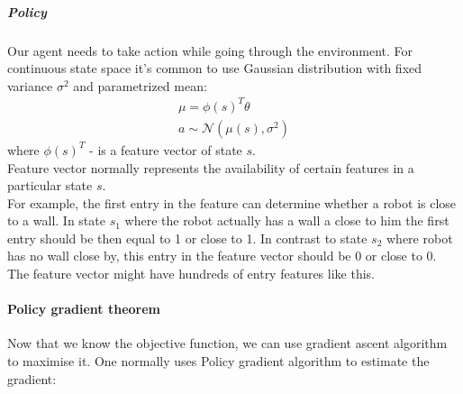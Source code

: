 \subparagraph{Policy} Our agent needs to take action while going through
the environment.
For continuous state space it's common to
use Gaussian distribution with fixed variance $\sigma^2$ and parametrized mean:
\begin{align} \label{eq:param_mean}
	\mu = \phi(s)^{T} \theta \\
	a \sim \mathcal{N}(\mu(s), \sigma^2)
\end{align}
where $\phi(s)^{T}$ - is a feature vector of state $s$. \\
Feature vector normally represents the availability of certain features in
a particular state $s$. \\
For example, the first entry in the feature can determine
whether a robot is close to a wall. In state $s_1$
where the robot actually has a wall a close to him
the first entry should be then equal to 1 or close to 1.
In contrast to state $s_2$ where
robot has no wall close by, this entry in the feature vector
should be 0 or close to 0.
The feature vector might have hundreds of entry features like this.



%







\paragraph{Policy gradient theorem}
Now that we know the objective function, we can use gradient ascent
algorithm to maximise it. One normally uses Policy gradient
algorithm to estimate the gradient:

